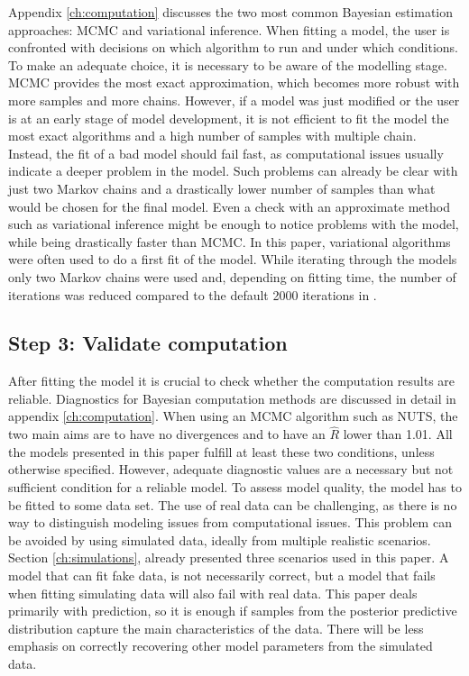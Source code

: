 Appendix \ref{ch:computation} discusses the two most common Bayesian estimation approaches: MCMC and variational inference.
When fitting a model, the user is confronted with decisions on which algorithm to run and under which conditions.
To make an adequate choice, it is necessary to be aware of the modelling stage.
MCMC provides the most exact approximation, which becomes more robust with more samples and more chains.
However, if a model was just modified or the user is at an early stage of model development, it is not efficient to fit the model the most exact algorithms and a high number of samples with multiple chain.
Instead, the fit of a bad model should fail fast, as computational issues usually indicate a deeper problem in the model.
Such problems can already be clear with just two Markov chains and a drastically lower number of samples than what would be chosen for the final model.
Even a check with an approximate method such as variational inference might be enough to notice problems with the model, while being drastically faster than MCMC.
In this paper, variational algorithms were often used to do a first fit of the model.
While iterating through the models only two Markov chains were used and, depending on fitting time, the number of iterations was reduced compared to the default 2000 iterations in  \cite{stan_development_team_stan_2021}.


\subsection{Step 3: Validate computation}

After fitting the model it is crucial to check whether the computation results are reliable.
Diagnostics for Bayesian computation methods are discussed in detail in appendix \ref{ch:computation}.
When using an MCMC algorithm such as NUTS, the two main aims are to have no divergences and to have an $\hat R$ lower than 1.01.
All the models presented in this paper fulfill at least these two conditions, unless otherwise specified.
However, adequate diagnostic values are a necessary but not sufficient condition for a reliable model.
To assess model quality, the model has to be fitted to some data set.
The use of real data can be challenging, as there is no way to distinguish modeling issues from computational issues.
This problem can be avoided by using simulated data, ideally from multiple realistic scenarios.
Section \ref{ch:simulations}, already presented three scenarios used in this paper.
A model that can fit fake data, is not necessarily correct, but a model that fails when fitting simulating data will also fail with real data.
This paper deals primarily with prediction, so it is enough if samples from the posterior predictive distribution capture the main characteristics of the data.
There will be less emphasis on correctly recovering other model parameters from the simulated data.

